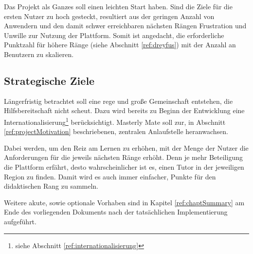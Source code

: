 Das Projekt als Ganzes soll einen leichten Start haben. Sind die Ziele für die
ersten Nutzer zu hoch gesteckt, resultiert aus der geringen Anzahl von Anwendern
und den damit schwer erreichbaren nächsten Rängen Frustration und Unwille zur
Nutzung der Plattform. Somit ist angedacht, die erforderliche Punktzahl für
höhere Ränge (siehe Abschnitt \ref{ref:dreyfus}) mit der Anzahl an Benutzern zu
skalieren.

\subsection{Strategische Ziele}
Längerfristig betrachtet soll eine rege und große Gemeinschaft entstehen, die
Hilfsbereitschaft nicht scheut. Dazu wird bereits zu Beginn der Entwicklung eine
Internationalisierung\footnote{siehe Abschnitt \ref{ref:internationalisierung}}
berücksichtigt. Masterly Mate soll zur, in Abschnitt \ref{ref:projectMotivation}
beschriebenen, zentralen Anlaufstelle heranwachsen.

Dabei werden, um den Reiz am Lernen zu erhöhen, mit der Menge der Nutzer die
Anforderungen für die jeweils nächsten Ränge erhöht. Denn je mehr Beteiligung
die Plattform erfährt, desto wahrscheinlicher ist es, einen Tutor in der
jeweiligen Region zu finden. Damit wird es auch immer einfacher, Punkte für den
didaktischen Rang zu sammeln.

Weitere akute, sowie optionale Vorhaben sind in Kapitel \ref{ref:chaptSummary}
am Ende des vorliegenden Dokuments nach der tatsächlichen
Implementierung aufgeführt.
